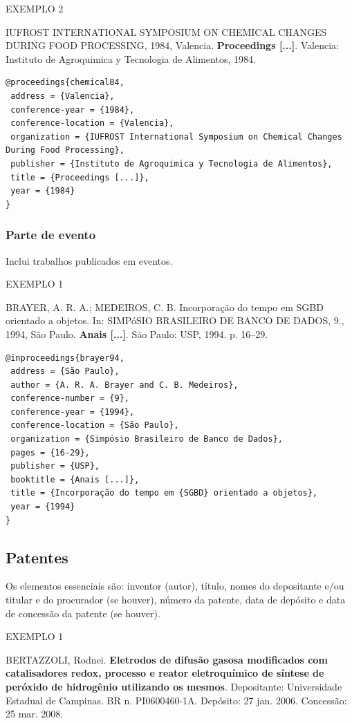 EXEMPLO 2 

IUFROST INTERNATIONAL SYMPOSIUM ON CHEMICAL CHANGES DURING FOOD PROCESSING, 1984, Valencia. \textbf{Proceedings [...]}. Valencia: Instituto de Agroquimica y Tecnologia de Alimentos, 1984.

\begin{verbatim}
@proceedings{chemical84,
 address = {Valencia},
 conference-year = {1984},
 conference-location = {Valencia},
 organization = {IUFROST International Symposium on Chemical Changes During Food Processing},
 publisher = {Instituto de Agroquimica y Tecnologia de Alimentos},
 title = {Proceedings [...]},
 year = {1984}
}
\end{verbatim}

\subsubsection{Parte de evento}

Inclui trabalhos publicados em eventos.

EXEMPLO 1 

BRAYER, A. R. A.; MEDEIROS, C. B. Incorporação do tempo em SGBD orientado a objetos. In: SIMPóSIO BRASILEIRO DE BANCO DE DADOS, 9., 1994, São Paulo. \textbf{Anais [...]}. São Paulo: USP, 1994. p. 16–29. 

\begin{verbatim}
@inproceedings{brayer94,
 address = {São Paulo},
 author = {A. R. A. Brayer and C. B. Medeiros},
 conference-number = {9},
 conference-year = {1994},
 conference-location = {São Paulo},
 organization = {Simpósio Brasileiro de Banco de Dados},
 pages = {16-29},
 publisher = {USP},
 booktitle = {Anais [...]},
 title = {Incorporação do tempo em {SGBD} orientado a objetos},
 year = {1994}
}
\end{verbatim}

\subsection{Patentes}

Os elementos essenciais são: inventor (autor), título, nomes do depositante e/ou titular e do procurador (se houver), número da patente, data de depósito e data de concessão da patente (se houver).

EXEMPLO 1 

BERTAZZOLI, Rodnei. \textbf{Eletrodos de difusão gasosa modificados com catalisadores redox, processo e reator eletroquímico de síntese de peróxido de hidrogênio utilizando os mesmos}. Depositante: Universidade Estadual de Campinas. BR n. PI0600460-1A. Depósito: 27 jan. 2006. Concessão: 25 mar. 2008. 

